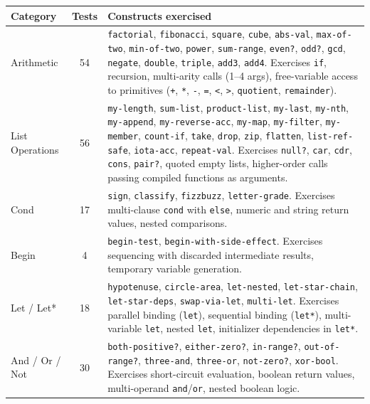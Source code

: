 \documentclass[12pt]{report}
\begin{document}
\begin{center}
\begin{longtable}{lcp{7.5cm}}
\toprule
\textbf{Category} & \textbf{Tests} & \textbf{Constructs exercised} \\
\midrule
\endhead
Arithmetic & 54 &
  \texttt{factorial}, \texttt{fibonacci}, \texttt{square}, \texttt{cube},
  \texttt{abs-val}, \texttt{max-of-two}, \texttt{min-of-two},
  \texttt{power}, \texttt{sum-range}, \texttt{even?}, \texttt{odd?},
  \texttt{gcd}, \texttt{negate}, \texttt{double}, \texttt{triple},
  \texttt{add3}, \texttt{add4}.
  Exercises \texttt{if}, recursion, multi-arity calls (1--4 args),
  free-variable access to primitives (\texttt{+}, \texttt{*},
  \texttt{-}, \texttt{=}, \texttt{<}, \texttt{>}, \texttt{quotient},
  \texttt{remainder}). \\[0.5em]
List Operations & 56 &
  \texttt{my-length}, \texttt{sum-list}, \texttt{product-list},
  \texttt{my-last}, \texttt{my-nth}, \texttt{my-append},
  \texttt{my-reverse-acc}, \texttt{my-map}, \texttt{my-filter},
  \texttt{my-member}, \texttt{count-if}, \texttt{take}, \texttt{drop},
  \texttt{zip}, \texttt{flatten}, \texttt{list-ref-safe},
  \texttt{iota-acc}, \texttt{repeat-val}.
  Exercises \texttt{null?}, \texttt{car}, \texttt{cdr}, \texttt{cons},
  \texttt{pair?}, quoted empty lists, higher-order calls passing
  compiled functions as arguments. \\[0.5em]
Cond & 17 &
  \texttt{sign}, \texttt{classify}, \texttt{fizzbuzz},
  \texttt{letter-grade}.
  Exercises multi-clause \texttt{cond} with \texttt{else},
  numeric and string return values, nested comparisons. \\[0.5em]
Begin & 4 &
  \texttt{begin-test}, \texttt{begin-with-side-effect}.
  Exercises sequencing with discarded intermediate results,
  temporary variable generation. \\[0.5em]
Let / Let* & 18 &
  \texttt{hypotenuse}, \texttt{circle-area}, \texttt{let-nested},
  \texttt{let-star-chain}, \texttt{let-star-deps},
  \texttt{swap-via-let}, \texttt{multi-let}.
  Exercises parallel binding (\texttt{let}), sequential binding
  (\texttt{let*}), multi-variable \texttt{let}, nested \texttt{let},
  initializer dependencies in \texttt{let*}. \\[0.5em]
And / Or / Not & 30 &
  \texttt{both-positive?}, \texttt{either-zero?}, \texttt{in-range?},
  \texttt{out-of-range?}, \texttt{three-and}, \texttt{three-or},
  \texttt{not-zero?}, \texttt{xor-bool}.
  Exercises short-circuit evaluation, boolean return values,
  multi-operand \texttt{and}/\texttt{or}, nested boolean logic. \\[0.5em]

\end{longtable}
\end{center}
\end{document}
